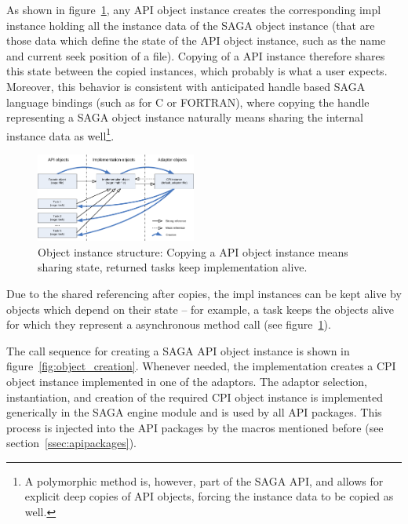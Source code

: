 As shown in figure~\ref{fig:object_structure}, any API object instance creates
the corresponding impl instance holding all the instance data
of the SAGA object instance (that are those data which define the state of the 
API object instance, such as the name and current seek position of a file). 
Copying of a API instance therefore shares this state between the copied 
instances, which probably is what a user expects. Moreover, this 
behavior is consistent with anticipated handle based SAGA language bindings 
(such as for C or FORTRAN), where copying the handle representing a SAGA 
object instance naturally means sharing the internal instance data as 
well\footnote{\small A polymorphic  method is, however, part 
of the SAGA API, and allows for explicit deep copies of API objects, 
forcing the instance data to be copied as well.}.  

\begin{figure}[!ht]
 \begin{center}
  \includegraphics[width=0.47\textwidth]{images/object_structure}
  \caption{\label{fig:object_structure}
    Object instance structure: Copying a API object instance means sharing 
    state, returned tasks keep implementation alive.}
 \end{center}
\end{figure}

Due to the shared
referencing after copies, the impl instances can be kept alive by objects
which depend on their state -- for example, a task keeps the objects
alive for which they represent a asynchronous method call (see
figure~\ref{fig:object_structure}).

The call sequence for creating a SAGA API object instance is shown in
figure~\ref{fig:object_creation}.  Whenever needed, the implementation
creates a CPI object instance implemented in one of the adaptors. The 
adaptor selection, instantiation, and creation of the required CPI object 
instance is implemented generically in the SAGA engine module and is 
used by all API packages. This process is injected into the API packages 
by the macros mentioned before (see section~\ref{ssec:apipackages}).

